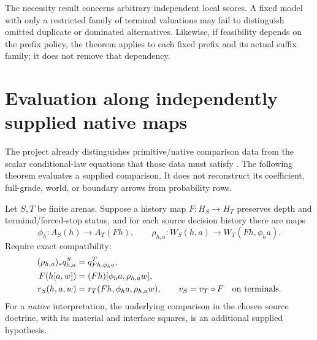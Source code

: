 \documentclass[11pt]{article}
\theoremstyle{definition}
\begin{document}
The necessity result concerns arbitrary independent local scores. A fixed
model with only a restricted family of terminal valuations may fail to
distinguish omitted duplicate or dominated alternatives. Likewise, if
feasibility depends on the prefix policy, the theorem applies to each
fixed prefix and its actual suffix family; it does not remove that
dependency.

\section{Evaluation along independently supplied native maps}
\label{sec:native}
The project already distinguishes primitive/native comparison data from
the scalar conditional-law equations that those data must satisfy
\cite{conditional,relative}. The following theorem evaluates a supplied
comparison. It does not reconstruct its coefficient, full-grade, world,
or boundary arrows from probability rows.

Let \(S,T\) be finite arenas. Suppose a history map \(F:H_S\to H_T\)
preserves depth and terminal/forced-stop status, and for each source
decision history there are maps
\[
 \phi_h:A_S(h)\to A_T(Fh),\qquad
 \rho_{h,a}:W_S(h,a)\to W_T(Fh,\phi_h a).
\]
Require exact compatibility:
\begin{align}
 (\rho_{h,a})_*q^S_{h,a}&=q^T_{Fh,\phi_h a},
       \label{eq:push}\\
 F(h[a,w])&=(Fh)[\phi_h a,\rho_{h,a}w], \label{eq:body}\\
 r_S(h,a,w)&=r_T(Fh,\phi_h a,\rho_{h,a}w),\qquad
 v_S=v_T\circ F\quad\hbox{on terminals}. \label{eq:reward}
\end{align}
For a \emph{native} interpretation, the underlying comparison in the
chosen source doctrine, with its material and interface squares, is an
additional supplied hypothesis.
\end{document}

